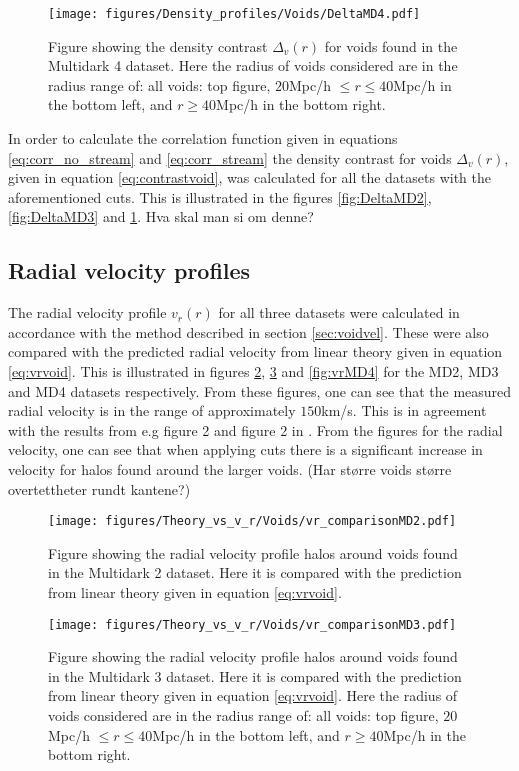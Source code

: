 \begin{figure}[htbp]
    \texttt{[image: figures/Density\_profiles/Voids/DeltaMD4.pdf]}
    \caption{Figure showing the density contrast $\Delta_v(r)$ for voids found in the Multidark 4 dataset. Here the radius of voids considered are in the radius range of: all voids: top figure, $20$Mpc/h $\leq r\leq 40$Mpc/h in the bottom left, and $r\geq 40$Mpc/h in the bottom right.}
    \label{fig:DeltaMD4}
\end{figure}
In order to calculate the correlation function given in equations \ref{eq:corr_no_stream} and \ref{eq:corr_stream} the density contrast for voids $\Delta_v(r)$, given in equation \ref{eq:contrastvoid}, was calculated for all the datasets with the aforementioned cuts. This is illustrated in the figures \ref{fig:DeltaMD2}, \ref{fig:DeltaMD3} and \ref{fig:DeltaMD4}. Hva skal man si om denne?
\subsection{Radial velocity profiles}
The radial velocity profile $v_r(r)$ for all three datasets were calculated in accordance with the method described in section \ref{sec:voidvel}. These were also compared with the predicted radial velocity from linear theory given in equation \ref{eq:vrvoid}. This is illustrated in figures \ref{fig:vrMD2}, \ref{fig:vrMD3} and \ref{fig:vrMD4} for the MD2, MD3 and MD4 datasets respectively. From these figures, one can see that the measured radial velocity is in the range of approximately $150$km/s. This is in agreement with the results from \cite{Nadathur_2018} e.g figure 2 and figure 2 in \cite{Achitouv_streaming}. From the figures for the radial velocity, one can see that when applying cuts there is a significant increase in velocity for halos found around the larger voids. (Har større voids større overtettheter rundt kantene?)\\\indent
\begin{figure}[htbp]
    \texttt{[image: figures/Theory\_vs\_v\_r/Voids/vr\_comparisonMD2.pdf]}
    \caption{Figure showing the radial velocity profile halos around voids found in the Multidark 2 dataset. Here it is compared with the prediction from linear theory given in equation \ref{eq:vrvoid}.}
    \label{fig:vrMD2}
\end{figure}

\begin{figure}[htbp]
    \texttt{[image: figures/Theory\_vs\_v\_r/Voids/vr\_comparisonMD3.pdf]}
    \caption{Figure showing the radial velocity profile halos around voids found in the Multidark 3 dataset. Here it is compared with the prediction from linear theory given in equation \ref{eq:vrvoid}. Here the radius of voids considered are in the radius range of: all voids: top figure, $20$Mpc/h $\leq r\leq 40$Mpc/h in the bottom left, and $r\geq 40$Mpc/h in the bottom right.}
    \label{fig:vrMD3}
\end{figure}

